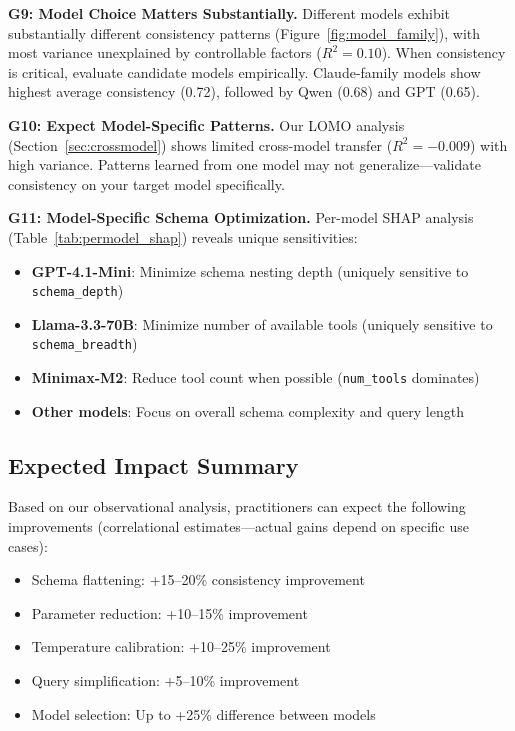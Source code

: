 \documentclass[sigconf,anonymous,review]{acmart}
\begin{document}
\textbf{G9: Model Choice Matters Substantially.} Different models exhibit substantially different consistency patterns (Figure~\ref{fig:model_family}), with most variance unexplained by controllable factors ($R^2=0.10$). When consistency is critical, evaluate candidate models empirically. Claude-family models show highest average consistency (0.72), followed by Qwen (0.68) and GPT (0.65).

\textbf{G10: Expect Model-Specific Patterns.} Our LOMO analysis (Section~\ref{sec:crossmodel}) shows limited cross-model transfer ($R^2 = -0.009$) with high variance. Patterns learned from one model may not generalize---validate consistency on your target model specifically.

\textbf{G11: Model-Specific Schema Optimization.} Per-model SHAP analysis (Table~\ref{tab:permodel_shap}) reveals unique sensitivities:
\begin{itemize}
    \item \textbf{GPT-4.1-Mini}: Minimize schema nesting depth (uniquely sensitive to \texttt{schema\_depth})
    \item \textbf{Llama-3.3-70B}: Minimize number of available tools (uniquely sensitive to \texttt{schema\_breadth})
    \item \textbf{Minimax-M2}: Reduce tool count when possible (\texttt{num\_tools} dominates)
    \item \textbf{Other models}: Focus on overall schema complexity and query length
\end{itemize}

\subsection{Expected Impact Summary}

Based on our observational analysis, practitioners can expect the following improvements (correlational estimates---actual gains depend on specific use cases):

\begin{itemize}
    \item Schema flattening: +15--20\% consistency improvement
    \item Parameter reduction: +10--15\% improvement
    \item Temperature calibration: +10--25\% improvement
    \item Query simplification: +5--10\% improvement
    \item Model selection: Up to +25\% difference between models
\end{itemize}
\end{document}
